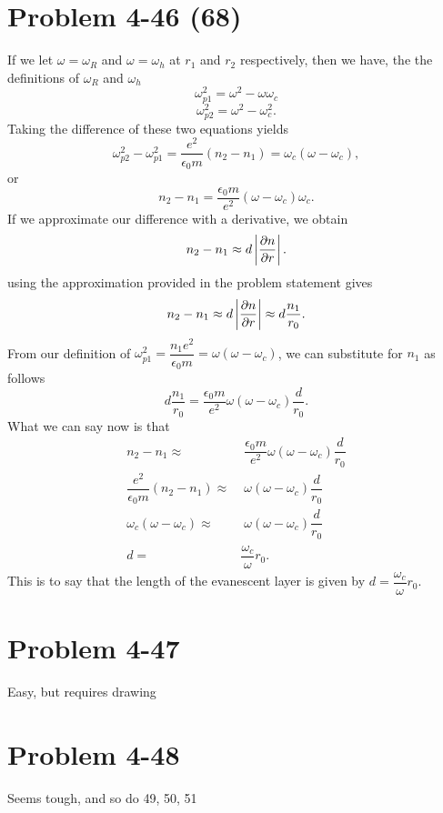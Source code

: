 \section*{Problem 4-46 (68)}
\label{sec:4-46}
If we let \(\omega = \omega_R \) and \(\omega = \omega_h \) at \(r_1\) and \(r_2\) respectively, then we have, the the definitions of \(\omega_R\) and \(\omega_h \)
\begin{equation*}
	\omega_{p1}^2 = \omega^2 - \omega\omega_c
\end{equation*}
\begin{equation*}
	\omega_{p2}^2 = \omega^2 - \omega_c^2.
\end{equation*}
Taking the difference of these two equations yields
\begin{equation*}
	\omega_{p2}^2 - \omega_{p1}^2 = \dfrac{e^2}{\epsilon_0m}\left(n_2 - n_1\right) = \omega_c\left(\omega - \omega_c \right),
\end{equation*}
or
\begin{equation*}
	n_2 - n_1 = \dfrac{\epsilon_0 m}{e^2}\left(\omega - \omega_c\right)\omega_c.
\end{equation*}
If we approximate our difference with a derivative, we obtain
\begin{equation*}
	n_2 - n_1 \approx d\left|\frac{\partial n}{\partial r}\right|.
\end{equation*}
using the approximation provided in the problem statement gives
\begin{equation*}
	n_2 - n_1 \approx d\left|\frac{\partial n}{\partial r}\right| \approx d\dfrac{n_1}{r_0}.
\end{equation*}
From our definition of \(\omega_{p1}^2 = \dfrac{n_1e^2}{\epsilon_0m} = \omega(\omega - \omega_c) \), we can substitute for \(n_1\) as follows
\begin{equation*}
	d\dfrac{n_1}{r_0} = \dfrac{\epsilon_0m}{e^2}\omega(\omega - \omega_c)\dfrac{d}{r_0}.
\end{equation*}
What we can say now is that
\begin{align*}
	n_2 - n_1 \approx& \;\dfrac{\epsilon_0 m }{e^2}\omega(\omega - \omega_c)\dfrac{d}{r_0}\\
	\dfrac{e^2}{\epsilon_0 m }(n_2 - n_1) \approx& \;\omega(\omega - \omega_c)\dfrac{d}{r_0}\\
	\omega_c(\omega - \omega_c) \approx& \;\omega(\omega - \omega_c)\dfrac{d}{r_0}\\
	d =& \dfrac{\omega_c}{\omega}r_0.
\end{align*}
This is to say that the length of the evanescent layer is given by \(d = \dfrac{\omega_c}{\omega}r_0.\)

\section*{Problem 4-47}
\label{sec:4-47}
Easy, but requires drawing

\section*{Problem 4-48}
\label{sec:4-48}
Seems tough, and so do 49, 50, 51
